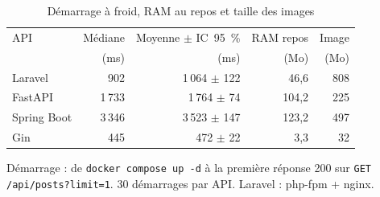 \begin{table}[htbp]
\centering
\small
\caption{Démarrage à froid, RAM au repos et taille des images}
\label{tab:demarrage}
\begin{tabular}{lrrrr}
\toprule
API & Médiane & Moyenne $\pm$ IC~95~\% & RAM repos & Image \\
 & (ms) & (ms) & (Mo) & (Mo) \\
\midrule
Laravel & 902 & 1\,064 $\pm$ 122 & 46,6 & 808 \\
FastAPI & 1\,733 & 1\,764 $\pm$ 74 & 104,2 & 225 \\
Spring Boot & 3\,346 & 3\,523 $\pm$ 147 & 123,2 & 497 \\
Gin & 445 & 472 $\pm$ 22 & 3,3 & 32 \\
\bottomrule
\end{tabular}
\par\smallskip\footnotesize Démarrage : de \texttt{docker compose up -d} à la première réponse 200 sur \texttt{GET /api/posts?limit=1}. 30 démarrages par API. Laravel : php-fpm + nginx.
\end{table}
